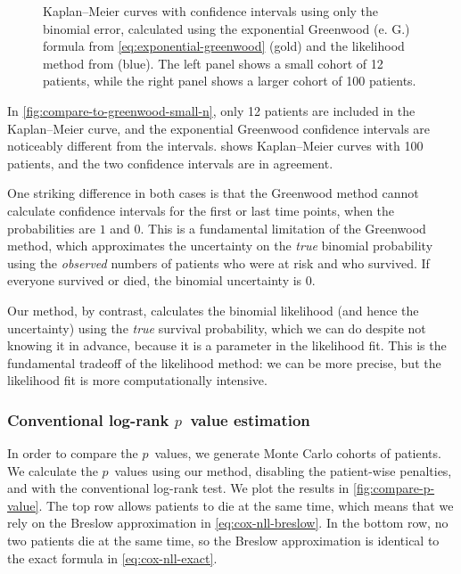 \documentclass[article]{jss}
\newcommand{\KM}{Kaplan--Meier} %
\begin{document}
\begin{figure}
\begin{subfigure}[t]{0.49\textwidth}
  \caption{\label{fig:compare-to-greenwood-large-n}}
\end{subfigure}
\caption{\label{fig:compare-to-greenwood} \KM{} curves with confidence intervals using only the binomial error, calculated using the exponential Greenwood (e. G.) formula from \cref{eq:exponential-greenwood} (gold) and the likelihood method from  (blue). The left panel shows a small cohort of 12 patients, while the right panel shows a larger cohort of 100 patients.}
\end{figure}

In \cref{fig:compare-to-greenwood-small-n}, only 12 patients are included in the \KM{} curve, and the exponential Greenwood confidence intervals are noticeably different from the  intervals.  shows \KM{} curves with 100 patients, and the two confidence intervals are in agreement.

One striking difference in both cases is that the Greenwood method cannot calculate confidence intervals for the first or last time points, when the probabilities are \(1\) and \(0\). This is a fundamental limitation of the Greenwood method, which approximates the uncertainty on the \emph{true} binomial probability using the \emph{observed} numbers of patients who were at risk and who survived. If everyone survived or died, the binomial uncertainty is \(0\).

Our method, by contrast, calculates the binomial likelihood (and hence the uncertainty) using the \emph{true} survival probability, which we can do despite not knowing it in advance, because it is a parameter in the likelihood fit. This is the fundamental tradeoff of the likelihood method: we can be more precise, but the likelihood fit is more computationally intensive.

\subsubsection[Conventional log-rank p~value estimation]{Conventional log-rank \(p\)~value estimation}\label{sec:compare-to-conventional-p-value}

In order to compare the \(p\)~values, we generate Monte Carlo cohorts of patients. We calculate the \(p\)~values using our method, disabling the patient-wise penalties, and with the conventional log-rank test. We plot the results in \cref{fig:compare-p-value}. The top row allows patients to die at the same time, which means that we rely on the Breslow approximation in \cref{eq:cox-nll-breslow}. In the bottom row, no two patients die at the same time, so the Breslow approximation is identical to the exact formula in \cref{eq:cox-nll-exact}.
\end{document}
